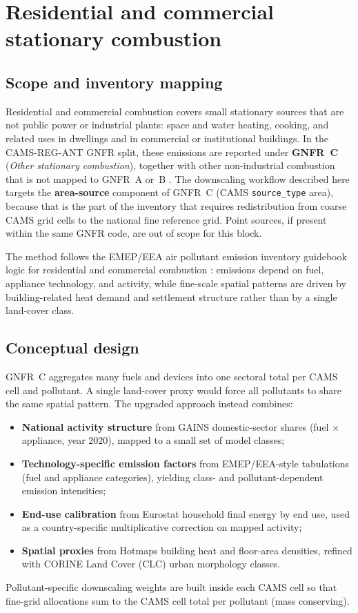 \section{Residential and commercial stationary combustion}
\label{sec:rescom}

\subsection{Scope and inventory mapping}

Residential and commercial combustion covers small stationary sources that are
not public power or industrial plants: space and water heating, cooking, and
related uses in dwellings and in commercial or institutional buildings. In the
CAMS-REG-ANT GNFR split, these emissions are reported under
\textbf{GNFR~C} (\emph{Other stationary combustion}), together with other
non-industrial combustion that is not mapped to GNFR~A or~B
\citep{cams_glob_ant}. The downscaling workflow described here targets the
\textbf{area-source} component of GNFR~C (CAMS \texttt{source\_type} area),
because that is the part of the inventory that requires redistribution from
coarse CAMS grid cells to the national fine reference grid. Point sources, if
present within the same GNFR code, are out of scope for this block.

The method follows the EMEP/EEA air pollutant emission inventory guidebook
logic for residential and commercial combustion \citep{EMEP_EEA}: emissions
depend on fuel, appliance technology, and activity, while fine-scale spatial
patterns are driven by building-related heat demand and settlement structure
rather than by a single land-cover class.

\subsection{Conceptual design}

GNFR~C aggregates many fuels and devices into one sectoral total per CAMS cell
and pollutant. A single land-cover proxy would force all pollutants to share
the same spatial pattern. The upgraded approach instead combines:
\begin{itemize}
  \item \textbf{National activity structure} from GAINS domestic-sector shares
        (fuel $\times$ appliance, year 2020), mapped to a small set of model
        classes;
  \item \textbf{Technology-specific emission factors} from EMEP/EEA-style
        tabulations (fuel and appliance categories), yielding class- and
        pollutant-dependent emission intensities;
  \item \textbf{End-use calibration} from Eurostat household final energy by
        end use, used as a country-specific multiplicative correction on mapped
        activity;
  \item \textbf{Spatial proxies} from Hotmaps building heat and floor-area
        densities, refined with CORINE Land Cover (CLC) urban morphology
        classes.
\end{itemize}
Pollutant-specific downscaling weights are built inside each CAMS cell so that
fine-grid allocations sum to the CAMS cell total per pollutant (mass
conserving).

